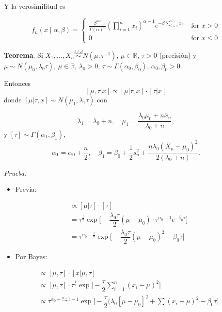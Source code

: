 \documentclass[
  12pt,
]{book}
\providecommand{\tightlist}{%
  \setlength{\itemsep}{0pt}\setlength{\parskip}{0pt}}
\begin{document}
Y la verosimilitud es

\begin{equation*}
f_n(x \mid \alpha, \beta)=\left\{\begin{array}{ll}
\displaystyle \frac{\beta^{n\alpha}}{\Gamma(\alpha)^n} \left(\prod_{i=1}^n x_i\right) ^{\alpha-1} e^{-\beta \sum_{i=1}^n  x_i} & \text { for } x>0 \\
0 & \text { for } x \leq 0
\end{array}\right.\end{equation*}

\textbf{Teorema}. Si \(X_1,\dots,X_n \overset{i.i.d}{\sim} N(\mu,\tau ^{-1})\), \(\mu \in \mathbb R\),
\(\tau>0\) (precisión) y \(\mu\sim N(\mu_0,\lambda_0\tau)\), \(\mu\in\mathbb R\), \(\lambda_0>0\), \(\tau\sim\Gamma(\alpha_0,\beta_0)\),
\(\alpha_0,\beta_0>0\).

Entonces
\[[\mu,\tau|x] \propto [\mu|\tau,x]\cdot[\tau|x]\]
donde \([\mu|\tau,x] \sim N(\mu_1,\lambda_1\tau)\) con

\[\lambda_1 = \lambda_0+n, \quad \mu_1 = \dfrac{\lambda_0\mu_0 + n\bar x_n}{\lambda_0+n},\]
y \([\tau] \sim \Gamma(\alpha_1,\beta_1)\),
\[\alpha_1 = \alpha_0+\dfrac n2, \quad \beta_1 = \beta_0 +  \dfrac 12s_n^2 + \dfrac{n\lambda_0(\bar X_n-\mu_0)^2}{2(\lambda_0+n)}.\]

\emph{Prueba}.

\begin{itemize}
\tightlist
\item
  Previa:
\end{itemize}

\begin{align*}
[\mu,\tau] & \propto [\mu|\tau] \cdot[\tau] \\
& = \tau^{\frac 12}\exp\bigg[-\dfrac{\lambda_0\tau}2(\mu-\mu_0)\cdot \tau^{\alpha_0-1}e^{-\beta_0\tau}\bigg]\\
& = \tau^{\alpha_0-\frac 12}\exp\bigg[-\dfrac{\lambda_0\tau}{2}(\mu-\mu_0)^2 - \beta_0\tau\bigg]
\end{align*}

\begin{itemize}
\tightlist
\item
  Por Bayes:
\end{itemize}

\begin{align*}
[\mu,\tau|x] & \propto [\mu,\tau]\cdot[x|\mu,\tau]\\
& \propto  [\mu,\tau]\cdot\tau^{\frac 12} \exp\bigg[-\dfrac\tau 2\sum_{i=1}^n(x_i-\mu)^2\bigg]\\
& \propto \tau^{\alpha_0+\frac{n+1}2-1}\exp\bigg[-\dfrac\tau 2(\lambda_0[\mu-\mu_0]^2 + \sum(x_i-\mu)^2-\beta_0\tau\bigg]
\end{align*}
\end{document}
